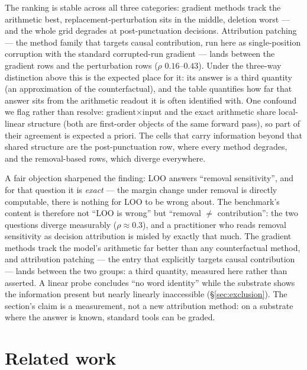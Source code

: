 \documentclass[11pt]{article}
\begin{document}
The ranking is stable across all three categories: gradient methods track
the arithmetic best, replacement-perturbation sits in the middle, deletion
worst --- and the whole grid degrades at post-punctuation decisions.
Attribution patching \cite{eap} --- the method family that targets causal
contribution, run here as single-position corruption with the standard
corrupted-run gradient --- lands between the gradient rows and the
perturbation rows ($\rho$ $0.16$--$0.43$). Under the three-way
distinction above this is the expected place for it: its answer is a
third quantity (an approximation of the counterfactual), and the table
quantifies how far that answer sits from the arithmetic readout it is
often identified with.
One confound we flag rather than resolve: gradient$\times$input and the
exact arithmetic share local-linear structure (both are first-order
objects of the same forward pass), so part of their agreement is expected
a priori. The cells that carry information beyond that shared structure
are the post-punctuation row, where every method degrades, and the
removal-based rows, which diverge everywhere.

A fair objection sharpened the finding: LOO answers ``removal
sensitivity'', and for that question it is \emph{exact} --- the margin
change under removal is directly computable, there is nothing for LOO to
be wrong about. The benchmark's content is therefore not ``LOO is
wrong'' but ``removal $\neq$ contribution'': the two questions diverge
measurably ($\rho \approx 0.3$), and a practitioner who reads removal
sensitivity as decision attribution is misled by exactly that much. The
gradient methods track the model's arithmetic far better than any
counterfactual method, and attribution patching --- the entry that
explicitly targets causal contribution --- lands between the two groups:
a third quantity, measured here rather than asserted. A linear probe concludes ``no word identity'' while the
substrate shows the information present but nearly linearly inaccessible
(\S\ref{sec:exclusion}). The section's claim is a measurement, not a new attribution
method: on a substrate where the answer is known, standard tools can be
graded.

\section{Related work}
\label{sec:related}
\end{document}
